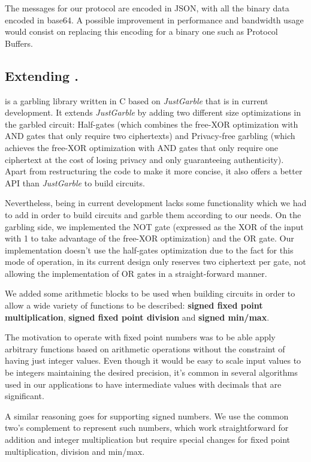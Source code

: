 The \MQTT{} messages for our protocol are encoded in JSON, with all the binary
data encoded in base64.  A possible improvement in performance and bandwidth
usage would consist on replacing this encoding for a binary one such as
Protocol Buffers.

\subsection{Extending \libgarble.}

\libgarble{} is a garbling library written in C based on \emph{JustGarble} that
is in current development.  It extends \emph{JustGarble} by adding two
different size optimizations in the garbled circuit: Half-gates (which combines
the free-XOR optimization with AND gates that only require two ciphertexts) and
Privacy-free garbling (which achieves the free-XOR optimization with AND gates
that only require one ciphertext at the cost of losing privacy and only
guaranteeing authenticity).  Apart from restructuring the code to make it more
concise, it also offers a better API than \emph{JustGarble} to build circuits.

Nevertheless, \libgarble{} being in current development lacks some
functionality which we had to add in order to build circuits and garble them
according to our needs.  On the garbling side, we implemented the NOT gate
(expressed as the XOR of the input with 1 to take advantage of the free-XOR
optimization) and the OR gate.  Our implementation doesn't use the half-gates
optimization due to the fact for this mode of operation, \libgarble{} in its
current design only reserves two ciphertext per gate, not allowing the
implementation of OR gates in a straight-forward manner.

We added some arithmetic blocks to be used when building circuits in order to
allow a wide variety of functions to be described: \textbf{signed fixed point
multiplication}, \textbf{signed fixed point division} and \textbf{signed
min/max}.

The motivation to operate with fixed point numbers was to be able apply
arbitrary functions based on arithmetic operations without the constraint of
having just integer values.  Even though it would be easy to scale input values
to be integers maintaining the desired precision, it's common in several
algorithms used in our applications to have intermediate values with decimals
that are significant.

A similar reasoning goes for supporting signed numbers.  We use the common
two's complement to represent such numbers, which work straightforward for
addition and integer multiplication but require special changes for fixed point
multiplication, division and min/max.

